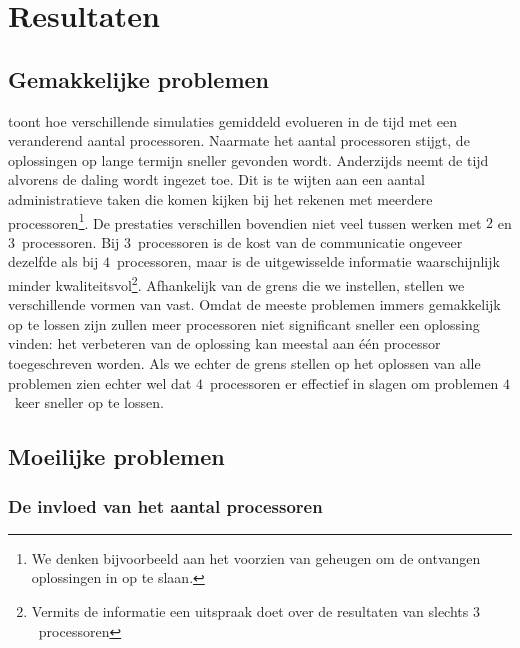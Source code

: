 \section{Resultaten}

\subsection{Gemakkelijke problemen}


 toont hoe verschillende simulaties gemiddeld evolueren in de tijd met een veranderend aantal processoren. Naarmate het aantal processoren stijgt, de oplossingen op lange termijn sneller gevonden wordt. Anderzijds neemt de tijd alvorens de daling wordt ingezet toe. Dit is te wijten aan een aantal administratieve taken die komen kijken bij het rekenen met meerdere processoren\footnote{We denken bijvoorbeeld aan het voorzien van geheugen om de ontvangen oplossingen in op te slaan.}. De prestaties verschillen bovendien niet veel tussen werken met $2$ en $3$~processoren. Bij $3$~processoren is de kost van de communicatie ongeveer dezelfde als bij $4$~processoren, maar is de uitgewisselde informatie waarschijnlijk minder kwaliteitsvol\footnote{Vermits de informatie een uitspraak doet over de resultaten van slechts $3$~processoren}. Afhankelijk van de grens die we instellen, stellen we verschillende vormen van \absu{} vast. Omdat de meeste problemen immers gemakkelijk op te lossen zijn zullen meer processoren niet significant sneller een oplossing vinden: het verbeteren van de oplossing kan meestal aan \'e\'en processor toegeschreven worden. Als we echter de grens stellen op het oplossen van alle problemen zien echter wel dat $4$~processoren er effectief in slagen om problemen $4$~keer sneller op te lossen.

\subsection{Moeilijke problemen}

\subsubsection{De invloed van het aantal processoren}


